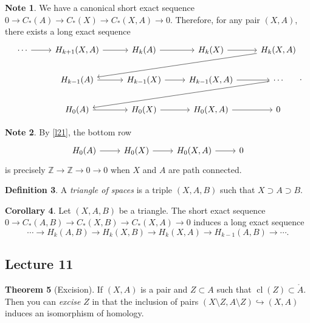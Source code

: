 \documentclass[10pt,letterpaper,cm]{nupset}
\theoremstyle{definition}
\newtheorem{definition}{Definition}[subsection]
\newtheorem{note}[definition]{Note}
\theoremstyle{theorem}
\newtheorem{theorem}[definition]{Theorem}
\newtheorem{corollary}[definition]{Corollary}
\theoremstyle{remark}
\newcommand{\Z}{\mathbb Z}
\newcommand{\1}{\mathbb{1}}
\newcommand{\0}{\vec 0}
\DeclareMathOperator{\cl}{cl}
\begin{document}
\begin{note}\label{c11}
We have a canonical short exact sequence $0 \to C_{\ast}(A) \to C_{\ast}(X) \to C_{\ast}(X,A) \to 0$. Therefore, for any pair $\left(X,A\right)$, there exists a long exact sequence
\[
\begin{tikzcd}
\cdots \arrow[r] & {H_{k+1}(X,A)} \arrow[r] & H_k(A) \arrow[r]     & H_k(X) \arrow[r]         & {H_k(X,A)} \arrow[llld] \\
                 & H_{k-1}(A) \arrow[r]     & H_{k-1}(X) \arrow[r] & {H_{k-1}(X,A)} \arrow[r] & \cdots \arrow[llld]     \\
                 & H_0(A) \arrow[r]         & H_0(X) \arrow[r]     & {H_0(X,A)} \arrow[r]     & 0                      
\end{tikzcd}
.\]
\end{note}

\begin{note} By \cref{l21}, the bottom row
\[
\begin{tikzcd}
H_0(A) \arrow[r]         & H_0(X) \arrow[r]     & {H_0(X,A)} \arrow[r]     & 0
\end{tikzcd}
\] is precisely $\Z \to \Z \to 0 \to 0$ when $X$ and $A$ are path connected.
\end{note}

\begin{definition}
A \textit{triangle of spaces} is a triple $\left(X, A, B\right)$ such that $X \supset A \supset B$.
\end{definition}

\begin{corollary}\label{c12}
Let $\left(X, A, B\right)$ be a triangle. The short exact sequence $0 \to C_{\ast}(A, B) \to C_{\ast}(X, B) \to C_{\ast}(X, A) \to 0$ induces a long exact sequence $$ \cdots \to  H_k(A, B) \to H_k(X, B) \to H_k(X, A) \to H_{k-1}(A, B) \to \cdots   .$$
\end{corollary}

\subsection{Lecture 11}

\begin{theorem}[Excision]\label{excision}
If $\left(X, A\right)$ is a pair and $Z\subset A$ such that $\cl(Z) \subset \mathring{A}$. Then you can \textit{excise} $Z$ in that the inclusion of pairs $\left(X\setminus Z, A \setminus Z\right) \hookrightarrow \left(X, A\right)$ induces an isomorphism of homology. 
\end{theorem}
\end{document}
